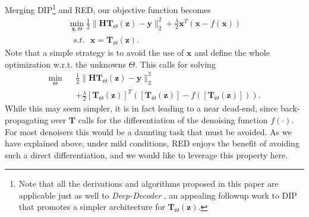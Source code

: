 \documentclass[12pt]{article}
\def\x{{\mathbf x}}
\def\H{{\mathbf H}}
\def\y{{\mathbf y}}
\def\z{{\mathbf z}}
\def\T{{\mathbf T}}
\begin{document}
Merging DIP\footnote{Note that all the derivations and algorithms proposed in this paper are applicable just as well to \emph{Deep-Decoder} \cite{DeepDecoder2019}, an appealing followup work to DIP that promotes a simpler architecture for $\T_{\Theta}(\z)$.} and RED, our objective function becomes 
\begin{eqnarray}\label{eq:DIP+RED}
\min_{\x, \Theta} \frac{1}{2} \|\H\T_{\Theta}(\z)-\y\|^2_2 + \frac{\lambda}{2}\x^T\left(\x-f(\x)\right) \\
\nonumber ~~~s.t.~~~ \x = \T_{\Theta}(\z).
\end{eqnarray}
Note that a simple strategy is to avoid the use of $\x$ and define the whole optimization w.r.t. the unknowns $\Theta$. This calls for solving 
\begin{eqnarray}
\min_{\Theta} && \frac{1}{2}  \|\H\T_{\Theta}(\z)-\y\|^2_2 
\nonumber \\ \nonumber
&&+ \frac{\lambda}{2} \left[\T_{\Theta}(\z)\right]^T 
\left( \left[\T_{\Theta}(\z)\right]-f\left(\left[\T_{\Theta}(\z)\right] \right)\right).
\end{eqnarray}
While this may seem simpler, it is in fact leading to a near dead-end, since back-propagating over $\T$ calls for the differentiation of the denoising function $f(\cdot)$. For most denoisers this would be a daunting task that must be avoided. As we have explained above, under mild conditions, RED enjoys the benefit of avoiding such a direct differentiation, and we would like to leverage this property here. 
\end{document}

